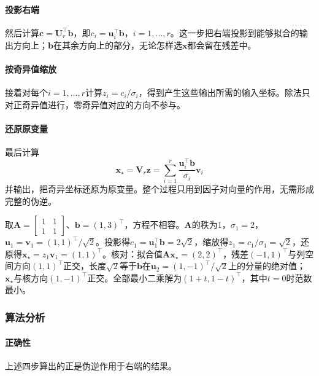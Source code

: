\paragraph{投影右端}
然后计算$\bm c=\bm U_r^\top\bm b$，即$c_i=\bm u_i^\top\bm b$，$i=1,\ldots,r$。这一步把右端投影到能够拟合的输出方向上；$\bm b$在其余方向上的部分，无论怎样选$\bm x$都会留在残差中。

\paragraph{按奇异值缩放}
接着对每个$i=1,\ldots,r$计算$z_i=c_i/\sigma_i$，得到产生这些输出所需的输入坐标。除法只对正奇异值进行，零奇异值对应的方向不参与。

\paragraph{还原原变量}
最后计算
\[
 \bm x_\star=\bm V_r\bm z=\sum_{i=1}^r\frac{\bm u_i^\top\bm b}{\sigma_i}\bm v_i
\]
并输出，把奇异坐标还原为原变量。整个过程只用到因子对向量的作用，无需形成完整的伪逆。

\begin{example}[秩一矩阵的SVD求解]
\label{ex:ls-svd-solve-rank-one}
取$\bm A=\left[\begin{smallmatrix}1&1\\1&1\end{smallmatrix}\right]$、$\bm b=(1,3)^\top$，方程不相容。$\bm A$的秩为$1$，$\sigma_1=2$，$\bm u_1=\bm v_1=(1,1)^\top/\sqrt2$。投影得$c_1=\bm u_1^\top\bm b=2\sqrt2$，缩放得$z_1=c_1/\sigma_1=\sqrt2$，还原得$\bm x_\star=z_1\bm v_1=(1,1)^\top$。核对：拟合值$\bm A\bm x_\star=(2,2)^\top$，残差$(-1,1)^\top$与列空间方向$(1,1)^\top$正交，长度$\sqrt2$等于$\bm b$在$\bm u_2=(1,-1)^\top/\sqrt2$上的分量的绝对值；$\bm x_\star$与核方向$(1,-1)^\top$正交。全部最小二乘解为$(1+t,1-t)^\top$，其中$t=0$时范数最小。
\end{example}

\subsubsection{算法分析}

\paragraph{正确性}
上述四步算出的正是伪逆作用于右端的结果。

